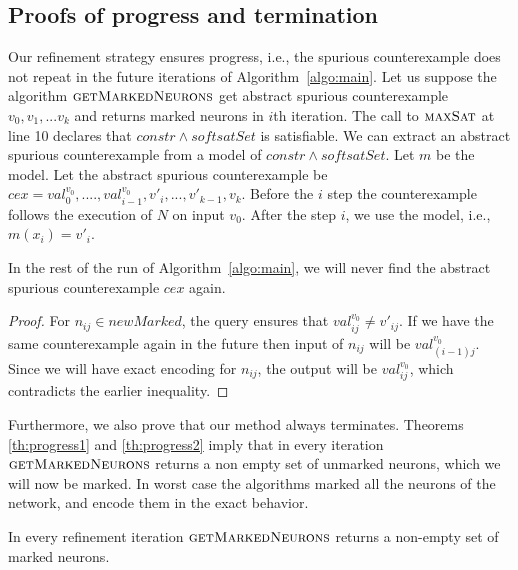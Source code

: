 \subsection{Proofs of progress and termination}

Our refinement strategy ensures progress, i.e., the spurious counterexample does not
repeat in the future
iterations of Algorithm~\ref{algo:main}. Let us suppose the algorithm
$\textsc{getMarkedNeurons}$ get abstract spurious counterexample
${v_0}, {v_1}, ... {v_k}$ and
returns marked neurons in $i$th iteration.
The call to $\textsc{maxSat}{}$ at line 10
declares that $constr \land softsatSet$ is satisfiable.
We can extract an abstract spurious counterexample from a model
of $constr \land softsatSet$.
Let $m$ be the model.
Let the abstract spurious counterexample be $cex = val_0^{v_0}, ...., val^{v_0}_{i-1},v'_{i},...,v'_{k-1},v_k$.
Before the $i$ step the counterexample follows the execution of $N$ on input $v_0$.
After the step $i$, we use the model, i.e., $m(x_i) = v'_i$.

\begin{theorem}
  In the rest of the run of Algorithm~\ref{algo:main}, we will never find the abstract
  spurious counterexample
  $cex$ again.
\end{theorem}
\begin{proof}
  For $n_{ij} \in newMarked$, the \maxsat{} query ensures that
  $val^{v_0}_{ij} \neq v'_{ij}$.
  If we have the same counterexample again in the future then
  input of $n_{ij}$ will be $val^{v_0}_{(i-1)j}$.
  Since we will have exact encoding for $n_{ij}$, the output
  will be $val^{v_0}_{ij}$, which contradicts the earlier inequality.  
\end{proof}

Furthermore, we also prove that our method always terminates.
%
Theorems \ref{th:progress1} and \ref{th:progress2} imply that in every
iteration $\textsc{getMarkedNeurons}$
returns a non empty set of unmarked neurons, which we will now be marked. In worst case the algorithms marked all 
the neurons of the network, and encode them in the exact behavior. 





\begin{theorem}
  \label{th:progress1}
  In every refinement iteration $\textsc{getMarkedNeurons}$
  returns a non-empty set of marked neurons. 
\end{theorem}

